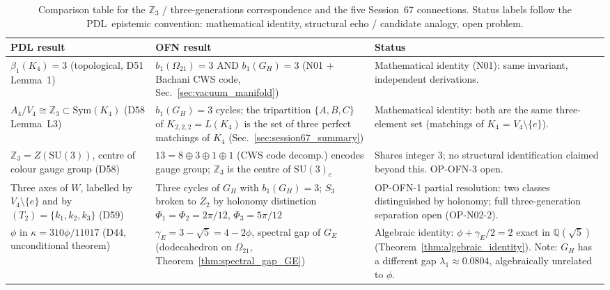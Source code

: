 \documentclass[11pt,a4paper]{article}
\theoremstyle{plain}
\theoremstyle{definition}
\theoremstyle{remark}
\newcommand{\PDL}{\textnormal{PDL}}
\newcommand{\Kfour}{K_4}
\newcommand{\Afour}{A_4}
\newcommand{\Vfour}{V_4}
\newcommand{\Zthree}{\mathbb{Z}_3}
\newcommand{\SUthree}{\mathrm{SU}(3)}
\newcommand{\kone}{k_1}
\newcommand{\ktwo}{k_2}
\newcommand{\kthree}{k_3}
\newcommand{\Omegatf}{\Omega_{21}}
\begin{document}
\begin{table}[H]
\centering
\small
\caption{Comparison table for the $\Zthree$ / three-generations correspondence and the five Session~67 connections. Status labels follow the \PDL\ epistemic convention: \textcolor{proofblue}{mathematical identity}, \textcolor{hypothesisorange}{structural echo / candidate analogy}, \textcolor{openproblemred}{open problem}.}
\label{tab:comparison}
\renewcommand{\arraystretch}{1.4}
\begin{tabular}{p{4.0cm}p{4.0cm}p{4.6cm}}
\toprule
\textbf{PDL result} & \textbf{OFN result} & \textbf{Status} \\
\midrule
$\beta_1(\Kfour) = 3$ (topological, D51 Lemma~1) &
$b_1(\Omegatf) = 3$ AND $b_1(G_H) = 3$ (N01 + Bachani CWS code, Sec.~\ref{sec:vacuum_manifold}) &
\textcolor{proofblue}{Mathematical identity (N01): same invariant, independent derivations.} \\[0.5em]
$\Afour/\Vfour \cong \Zthree \subset \mathrm{Sym}(\Kfour)$ (D58 Lemma~L3) &
$b_1(G_H) = 3$ cycles; the tripartition $\{A,B,C\}$ of $K_{2,2,2} = L(K_4)$ is the set of three perfect matchings of $K_4$ (Sec.~\ref{sec:session67_summary}) &
\textcolor{proofblue}{Mathematical identity: both are the same three-element set (matchings of $K_4$ = $V_4\setminus\{e\}$).} \\[0.5em]
$\Zthree = Z(\SUthree)$, centre of colour gauge group (D58) &
$13 = 8 \oplus 3 \oplus 1 \oplus 1$ (CWS code decomp.) encodes gauge group; $\Zthree$ is the centre of $\mathrm{SU}(3)_c$ &
\textcolor{hypothesisorange}{Shares integer 3; no structural identification claimed beyond this. OP-OFN-3 open.} \\[0.5em]
Three axes of $W$, labelled by $\Vfour\setminus\{e\}$ and by $(T_2)=\{\kone,\ktwo,\kthree\}$ (D59) &
Three cycles of $G_H$ with $b_1(G_H) = 3$; $S_3$ broken to $Z_2$ by holonomy distinction $\Phi_1=\Phi_2=2\pi/12$, $\Phi_3=5\pi/12$ &
\textcolor{hypothesisorange}{OP-OFN-1 partial resolution: two classes distinguished by holonomy; full three-generation separation open (OP-N02-2).} \\[0.5em]
$\phi$ in $\kappa = 310\phi/11017$ (D44, unconditional theorem) &
$\gamma_E = 3-\sqrt{5} = 4-2\phi$, spectral gap of $G_E$ (dodecahedron on $\Omega_{21}$, Theorem~\ref{thm:spectral_gap_GE}) &
\textcolor{proofblue}{Algebraic identity: $\phi + \gamma_E/2 = 2$ exact in $\mathbb{Q}(\sqrt{5})$ (Theorem~\ref{thm:algebraic_identity}). Note: $G_H$ has a different gap $\lambda_1\approx0.0804$, algebraically unrelated to $\phi$.} \\[0.5em]

\end{tabular}
\end{table}
\end{document}
